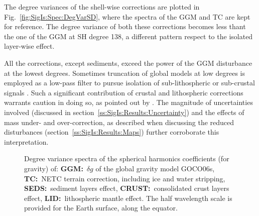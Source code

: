 The degree variances of the shell-wise corrections are plotted in Fig.~\ref{fig:SigIs:Spec:DegVarSD}, where the spectra of the GGM and TC are kept for reference.
The degree variance of both these corrections becomes less thant the one of the GGM at SH degree \num{138}, a different pattern respect to the isolated layer-wise effect.

All the corrections, except sediments, exceed the power of the GGM disturbance at the lowest degrees.
Sometimes truncation of global models at low degrees is employed as a low-pass filter to pursue isolation of sub-lithospheric or sub-crustal signals \parencites[e.g.]{Deschamps2001}{Simmons2010}.
Such a significant contribution of crustal and lithospheric corrections warrants caution in doing so, as pointed out by \cite{Kaban2004}.
The magnitude of uncertainties involved (discussed in section~\ref{ss:SigIs:Results:Uncertainty}) and the effects of mass under- and over-correction, as described when discussing the reduced disturbances (section~\ref{ss:SigIs:Results:Maps}) further corroborate this interpretation.



\begin{figure}
    \begin{adjustbox}{center}
    \end{adjustbox}
    \caption[Degree variance spectra of the SH coefficients for the GGM and the forward modelled corrections.]{
        Degree variance spectra of the spherical harmonics coefficients (for gravity) of:
        \textbf{{GGM}:}~$\delta g$ of the global gravity model {GOCO06s},
        \textbf{{TC}:}~NETC terrain correction, including ice and water stripping,
        \textbf{{SEDS}:}~sediment layers effect,
        \textbf{{CRUST}:}~consolidated crust layers effect,
        \textbf{{LID}:}~lithospheric mantle effect.
        The half wavelength scale is provided for the Earth surface, along the equator.}
    \label{fig:SigIs:Spec:DegVarAll}
\end{figure}

